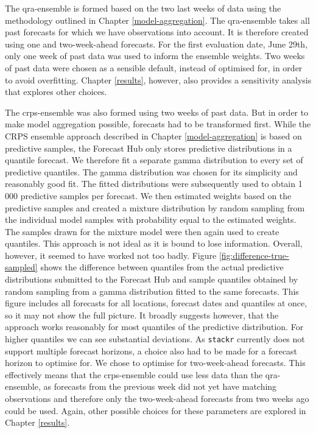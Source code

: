 \documentclass[
]{book}
\begin{document}
The qra-ensemble is formed based on the two last weeks of data using the methodology outlined in Chapter \ref{model-aggregation}. The qra-ensemble takes all past forecasts for which we have observations into account. It is therefore created using one and two-week-ahead forecasts. For the first evaluation date, June 29th, only one week of past data was used to inform the ensemble weights. Two weeks of past data were chosen as a sensible default, instead of optimised for, in order to avoid overfitting. Chapter \ref{results}, however, also provides a sensitivity analysis that explores other choices.

The crps-ensemble was also formed using two weeks of past data. But in order to make model aggregation possible, forecasts had to be transformed first. While the CRPS ensemble approach described in Chapter \ref{model-aggregation} is based on predictive samples, the Forecast Hub only stores predictive distributions in a quantile forecast. We therefore fit a separate gamma distribution to every set of predictive quantiles. The gamma distribution was chosen for its simplicity and reasonably good fit. The fitted distributions were subsequently used to obtain 1 000 predictive samples per forecast. We then estimated weights based on the predictive samples and created a mixture distribution by random sampling from the individual model samples with probability equal to the estimated weights. The samples drawn for the mixture model were then again used to create quantiles. This approach is not ideal as it is bound to lose information. Overall, however, it seemed to have worked not too badly. Figure \ref{fig:difference-true-sampled} shows the difference between quantiles from the actual predictive distributions submitted to the Forecast Hub and sample quantiles obtained by random sampling from a gamma distribution fitted to the same forecasts. This figure includes all forecasts for all locations, forecast dates and quantiles at once, so it may not show the full picture. It broadly suggests however, that the approach works reasonably for most quantiles of the predictive distribution. For higher quantiles we can see substantial deviations. As \texttt{stackr} currently does not support multiple forecast horizons, a choice also had to be made for a forecast horizon to optimise for. We chose to optimise for two-week-ahead forecasts. This effectively means that the crps-ensemble could use less data than the qra-ensemble, as forecasts from the previous week did not yet have matching observations and therefore only the two-week-ahead forecasts from two weeks ago could be used. Again, other possible choices for these parameters are explored in Chapter \ref{results}.
\end{document}

